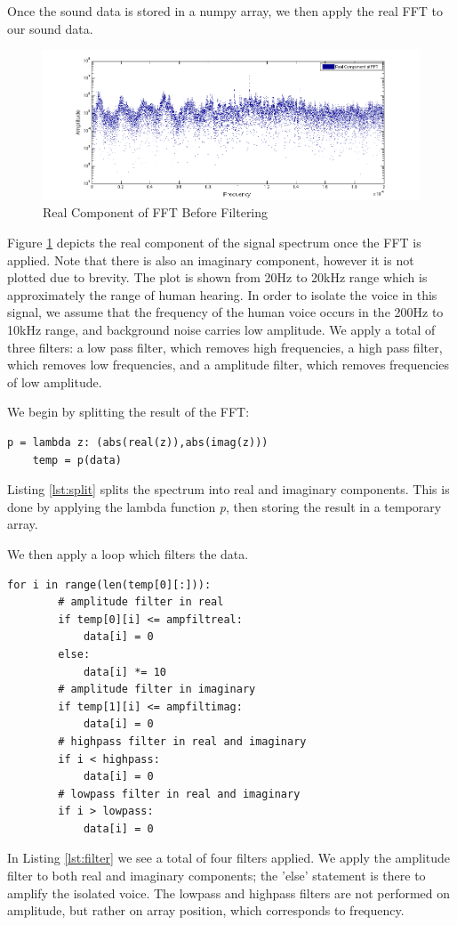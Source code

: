 Once the sound data is stored in a numpy array, we then apply the real FFT to our sound data.
\begin{figure}[H]
    \label{fig:beforeFilt}
    \centering
        \includegraphics[width=6.5in]{./include/beforefig.png}
        \caption{Real Component of FFT Before Filtering}
\end{figure}
Figure \ref{fig:beforeFilt} depicts the real component of the signal spectrum once the FFT is applied. Note that there is also an imaginary component, however it is not plotted due to brevity. The plot is shown from 20Hz to 20kHz range which is approximately the range of human hearing. In order to isolate the voice in this signal, we assume that the frequency of the human voice occurs in the 200Hz to 10kHz range, and background noise carries low amplitude. We apply a total of three filters: a low pass filter, which removes high frequencies, a high pass filter, which removes low frequencies, and a amplitude filter, which removes frequencies of low amplitude.

We begin by splitting the result of the FFT:
\begin{lstlisting}[caption={Splitting Spectrum into Real and Imaginary Components},label=lst:split,firstnumber=18]
    p = lambda z: (abs(real(z)),abs(imag(z)))
    temp = p(data)
\end{lstlisting}
Listing \ref{lst:split} splits the spectrum into real and imaginary components. This is done by applying the lambda function \emph{p}, then storing the result in a temporary array.

We then apply a loop which filters the data.
\begin{lstlisting}[caption={Filter Application},label=lst:filter,firstnumber=21]
    for i in range(len(temp[0][:])):
        # amplitude filter in real
        if temp[0][i] <= ampfiltreal:
            data[i] = 0
        else:
            data[i] *= 10
        # amplitude filter in imaginary
        if temp[1][i] <= ampfiltimag:
            data[i] = 0
        # highpass filter in real and imaginary
        if i < highpass:
            data[i] = 0
        # lowpass filter in real and imaginary
        if i > lowpass:
            data[i] = 0
\end{lstlisting}
In Listing \ref{lst:filter} we see a total of four filters applied. We apply the amplitude filter to both real and imaginary components; the 'else' statement is there to amplify the isolated voice. The lowpass and highpass filters are not performed on amplitude, but rather on array position, which corresponds to frequency. 

